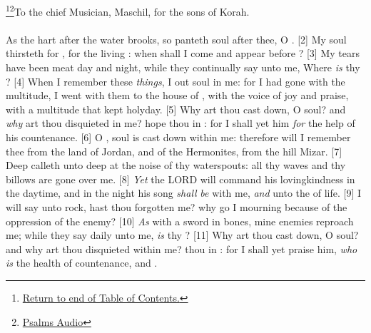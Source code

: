 \footnote{\textcolor[cmyk]{0.99998,1,0,0}{\hyperlink{TOC}{Return to end of Table of Contents.}}}\footnote{\href{https://audiobible.com/bible}{\textcolor[cmyk]{0.99998,1,0,0}{Psalms Audio}}}\textcolor[cmyk]{0.99998,1,0,0}{To the chief Musician, Maschil, for the sons of Korah.}\\
\\
\textcolor[cmyk]{0.99998,1,0,0}{As the hart  after the water brooks, so panteth  soul after thee, O .}
[2] \textcolor[cmyk]{0.99998,1,0,0}{My soul thirsteth for , for the living : when shall I come and appear before ?}
[3] \textcolor[cmyk]{0.99998,1,0,0}{My tears have been  meat day and night, while they continually say unto me, Where \emph{is} thy ?}
[4] \textcolor[cmyk]{0.99998,1,0,0}{When I remember these \emph{things}, I  out  soul in me: for I had gone with the multitude, I went with them to the house of , with the voice of joy and praise, with a multitude that kept holyday.}
[5] \textcolor[cmyk]{0.99998,1,0,0}{Why art thou cast down, O  soul? and \emph{why} art thou disquieted in me? hope thou in : for I shall yet  him \emph{for} the help of his countenance.}
[6] \textcolor[cmyk]{0.99998,1,0,0}{O  ,  soul is cast down within me: therefore will I remember thee from the land of Jordan, and of the Hermonites, from the hill Mizar.}
[7] \textcolor[cmyk]{0.99998,1,0,0}{Deep calleth unto deep at the noise of thy waterspouts: all thy waves and thy billows are gone over me.}
[8] \textcolor[cmyk]{0.99998,1,0,0}{\emph{Yet} the LORD will command his lovingkindness in the daytime, and in the night his song \emph{shall} \emph{be} with me, \emph{and}   unto the  of  life.}
[9] \textcolor[cmyk]{0.99998,1,0,0}{I will say unto   rock,  hast thou forgotten me? why go I mourning because of the oppression of the enemy?}
[10] \textcolor[cmyk]{0.99998,1,0,0}{\emph{As} with a sword in  bones, mine enemies reproach me; while they say daily unto me,  \emph{is} thy ?}
[11] \textcolor[cmyk]{0.99998,1,0,0}{Why art thou cast down, O  soul? and why art thou disquieted within me?  thou in : for I shall yet praise him, \emph{who} \emph{is} the health of  countenance, and  .}